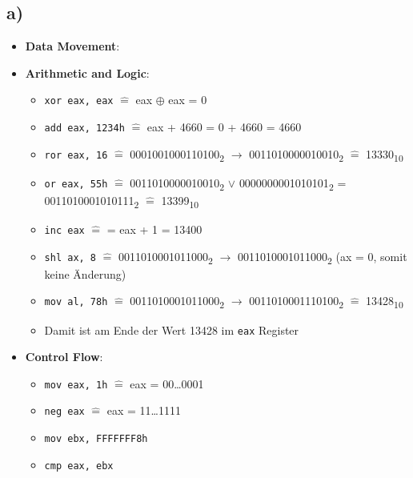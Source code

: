 \documentclass[]{scrreprt}
\begin{document}
\subsection*{a)}
\begin{itemize}
	\item \textbf{Data Movement}:
	
	\item  \textbf{Arithmetic and Logic}:
	\begin{itemize}
		\item \texttt{xor eax, eax} $\hat{=}$ eax $\oplus$ eax = 0
		\item \texttt{add eax, 1234h} $\hat{=}$ eax + 4660 = 0 + 4660 = 4660
		\item \texttt{ror eax, 16} $\hat{=}$ {0001001000110100}\textsubscript{2} $\rightarrow$ {0011010000010010}\textsubscript{2} $\hat{=}$  {13330}\textsubscript{10}
		\item \texttt{or eax, 55h} $\hat{=}$ {0011010000010010}\textsubscript{2} $\vee$ {0000000001010101}\textsubscript{2} = {0011010001010111}\textsubscript{2} $\hat{=}$ {13399}\textsubscript{10}
		\item \texttt{inc eax} $\hat{=}$ = eax + 1 = 13400
		\item \texttt{shl ax, 8} $\hat{=}$ 0011010001011000\textsubscript{2} $\rightarrow$ 0011010001011000\textsubscript{2} (ax = 0, somit keine Änderung)
		\item  \texttt{mov al, 78h} $\hat{=}$ 0011010001011000\textsubscript{2} $\rightarrow$ 0011010001110100\textsubscript{2} $\hat{=}$ 13428\textsubscript{10}
		\item Damit ist am Ende der Wert 13428 im \texttt{eax} Register
	\end{itemize}
	
	\item \textbf{Control Flow}:
	\begin{itemize}
		\item \texttt{mov eax, 1h} $\hat{=}$ eax = 00\dots0001
		\item \texttt{neg eax} $\hat{=}$ eax = 11\dots1111
		\item \texttt{mov ebx, FFFFFFF8h}
		\item \texttt{cmp eax, ebx} 
	\end{itemize}
\end{itemize}
\end{document}
